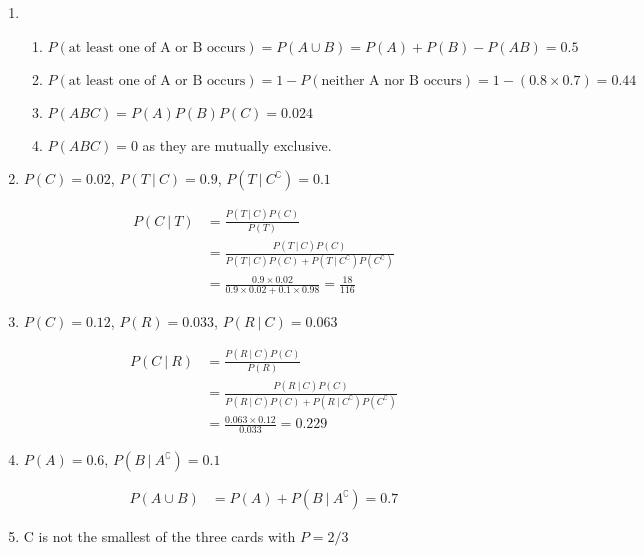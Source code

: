 \begin{enumerate}
\begin{enumerate}
	\end{enumerate}
	
	\item \begin{enumerate}
		\item $ P(\text{at least one of A or B occurs}) = P(A \cup B) = P(A) + P(B) - P(AB) = 0.5$\\
		
		\item $ P(\text{at least one of A or B occurs}) = 1 - P(\text{neither A nor B occurs}) = 1 - (0.8 \times 0.7) = 0.44$ \\
		
		\item $ P(ABC) = P(A) P(B) P(C) = 0.024 $\\
		
		\item $ P(ABC) = 0 $ as they are mutually exclusive.
		
	\end{enumerate}
	
	\item $ P(C) = 0.02 $, $ P(T\ |\ C) = 0.9 $, $ P(T\ |\ C^\complement) = 0.1 $
	
	\begin{align}
		P(C\ |\ T) &= \frac{P(T\ |\ C)P(C)}{P(T)} \\
		&= \frac{P(T\ |\ C)P(C)}{P(T\ |\ C)P(C) + P(T\ |\ C^\complement)P(C^\complement)} \\
		&= \frac{0.9 \times 0.02}{0.9 \times 0.02 + 0.1 \times 0.98} = \frac{18}{116}
	\end{align}
	
	\item $ P(C) = 0.12 $, $ P(R) = 0.033 $, $ P(R\ |\ C) = 0.063 $
	
	\begin{align}
		P(C\ |\ R) &= \frac{P(R\ |\ C)P(C)}{P(R)} \\
		&= \frac{P(R\ |\ C)P(C)}{P(R\ |\ C)P(C) + P(R\ |\ C^\complement)P(C^\complement)} \\
		&= \frac{0.063 \times 0.12}{0.033} = 0.229
	\end{align} 
	
	
	\item $ P(A) = 0.6 $, $ P(B\ |\ A^\complement) = 0.1 $
	
	\begin{align}
		P(A \cup B) &= P(A) + P(B\ |\ A^\complement) = 0.7
	\end{align} 
	
	\item C is not the smallest of the three cards with $ P = 2/3 $
	

\end{enumerate}
